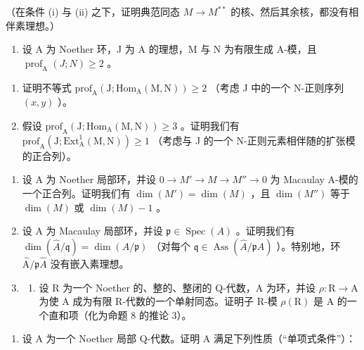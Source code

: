 （在条件 (i) 与 (ii) 之下，证明典范同态 \(M \to M^{**}\) 的核、然后其余核，都没有相伴素理想。）

\begin{enumerate}
\def\labelenumi{\arabic{enumi})}
\setcounter{enumi}{17}
\tightlist
\item
  设 A 为 Noether 环，J 为 A 的理想，M 与 N 为有限生成 A-模，且 \(\operatorname{prof}_{\mathrm{A}}(J;N)\geqslant2\) 。
\end{enumerate}

\begin{enumerate}
\def\labelenumi{\alph{enumi})}
\item
  证明不等式 \(\mathrm{prof}_{\mathrm{A}}(\mathrm{J};\mathrm{Hom}_{\mathrm{A}}(\mathrm{M},\mathrm{N}))\geqslant 2\) （考虑 J 中的一个 N-正则序列 \((x,y)\) ）。
\item
  假设 \(\mathrm{prof}_{\mathrm{A}}(\mathrm{J};\mathrm{Hom}_{\mathrm{A}}(\mathrm{M},\mathrm{N}))\geqslant 3\) 。证明我们有 \(\mathrm{prof}_{\mathrm{A}}(\mathrm{J};\mathrm{Ext}_{\mathrm{A}}^{1}(\mathrm{M},\mathrm{N}))\geqslant 1\) （考虑与 J 的一个 N-正则元素相伴随的扩张模的正合列）。
\end{enumerate}


\begin{enumerate}
\def\labelenumi{\arabic{enumi})}
\item
  设 A 为 Noether 局部环，并设 \(0 \to M' \to M \to M'' \to 0\) 为 Macaulay A-模的一个正合列。证明我们有 \(\dim(M') = \dim(M)\) ，且 \(\dim(M'')\) 等于 \(\dim(M)\) 或 \(\dim(M) - 1\) 。
\item
  设 A 为 Macaulay 局部环，并设 \(\mathfrak{p} \in \operatorname{Spec}(A)\) 。证明我们有 \(\dim(\widehat{A}/\mathfrak{q}) = \dim(A/\mathfrak{p})\) （对每个 \(\mathfrak{q} \in \operatorname{Ass}(\widehat{A}/\mathfrak{p}\widehat{A})\) ）。特别地，环 \(\widehat{\mathrm{A}}/\mathfrak{p}\widehat{A}\) 没有嵌入素理想。
\item
  \begin{enumerate}
  \def\labelenumii{\alph{enumii})}
  \tightlist
  \item
    设 R 为一个 Noether 的、整的、整闭的 Q-代数，A 为环，并设 \(\rho: \mathrm{R} \to \mathrm{A}\) 为使 A 成为有限 R-代数的一个单射同态。证明子 R-模 \(\rho(\mathrm{R})\) 是 A 的一个直和项（化为命题 8 的推论 3）。
  \end{enumerate}
\end{enumerate}

\begin{enumerate}
\def\labelenumi{\alph{enumi})}
\setcounter{enumi}{1}
\tightlist
\item
  设 A 为一个 Noether 局部 Q-代数。证明 A 满足下列性质（“单项式条件”）：
\end{enumerate}

